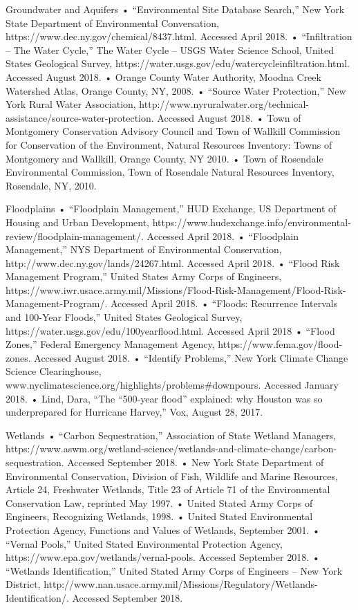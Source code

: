 Groundwater and Aquifers
    • “Environmental Site Database Search,” New York State Department of Environmental Conversation, https://www.dec.ny.gov/chemical/8437.html. Accessed April 2018.
    • “Infiltration – The Water Cycle,” The Water Cycle – USGS Water Science School, United States Geological Survey, https://water.usgs.gov/edu/watercycleinfiltration.html. Accessed August 2018.
    • Orange County Water Authority, Moodna Creek Watershed Atlas, Orange County, NY, 2008.
    • “Source Water Protection,” New York Rural Water Association, http://www.nyruralwater.org/technical-assistance/source-water-protection. Accessed August 2018.
    • Town of Montgomery Conservation Advisory Council and Town of Wallkill Commission for Conservation of the Environment, Natural Resources Inventory: Towns of Montgomery and Wallkill, Orange County, NY 2010.
    • Town of Rosendale Environmental Commission, Town of Rosendale Natural Resources Inventory, Rosendale, NY, 2010.

Floodplains
    • “Floodplain Management,” HUD Exchange, US Department of Housing and Urban Development, https://www.hudexchange.info/environmental-review/floodplain-management/. Accessed April 2018.
    • “Floodplain Management,” NYS Department of Environmental Conservation, http://www.dec.ny.gov/lands/24267.html. Accessed April 2018.
    • “Flood Risk Management Program,” United States Army Corps of Engineers, https://www.iwr.usace.army.mil/Missions/Flood-Risk-Management/Flood-Risk-Management-Program/. Accessed April 2018.
    • “Floods: Recurrence Intervals and 100-Year Floods,” United States Geological Survey, https://water.usgs.gov/edu/100yearflood.html. Accessed April 2018
    • “Flood Zones,” Federal Emergency Management Agency, https://www.fema.gov/flood-zones. Accessed August 2018.
    • “Identify Problems,” New York Climate Change Science Clearinghouse, www.nyclimatescience.org/highlights/problems#downpours. Accessed January 2018.
    • Lind, Dara, “The “500-year flood” explained: why Houston was so underprepared for Hurricane Harvey,” Vox, August 28, 2017.

Wetlands
    • “Carbon Sequestration,” Association of State Wetland Managers, https://www.aswm.org/wetland-science/wetlands-and-climate-change/carbon-sequestration. Accessed September 2018.
    • New York State Department of Environmental Conservation, Division of Fish, Wildlife and Marine Resources, Article 24, Freshwater Wetlands, Title 23 of Article 71 of the Environmental Conservation Law, reprinted May 1997.
    • United Stated Army Corps of Engineers, Recognizing Wetlands, 1998.
    • United Stated Environmental Protection Agency, Functions and Values of Wetlands, September 2001.
    • “Vernal Pools,” United Stated Environmental Protection Agency, https://www.epa.gov/wetlands/vernal-pools. Accessed September 2018.
    • “Wetlands Identification,” United Stated Army Corps of Engineers – New York District, http://www.nan.usace.army.mil/Missions/Regulatory/Wetlands-Identification/. Accessed September 2018.

